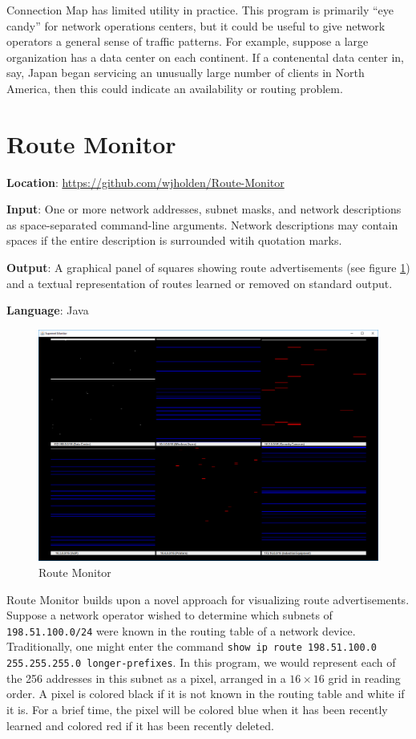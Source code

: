 \documentclass[12pt]{article}
\begin{document}
Connection Map has limited utility in practice. This program is primarily ``eye candy'' for network operations centers, but it could be useful to give network operators a general sense of traffic patterns. For example, suppose a large organization has a data center on each continent. If a contenental data center in, say, Japan began servicing an unusually large number of clients in North America, then this could indicate an availability or routing problem.

\section{Route Monitor}

\textbf{Location}: \url{https://github.com/wjholden/Route-Monitor}

\textbf{Input}: One or more network addresses, subnet masks, and network descriptions as space-separated command-line arguments. Network descriptions may contain spaces if the entire description is surrounded witih quotation marks.

\textbf{Output}: A graphical panel of squares showing route advertisements (see figure \ref{fig:Route-Monitor-1}) and a textual representation of routes learned or removed on standard output.

\textbf{Language}: Java

\begin{figure}[h]
\centering
\includegraphics[width=\textwidth]{Route-Monitor-1}
\caption{Route Monitor}
\label{fig:Route-Monitor-1}
\end{figure}

Route Monitor builds upon a novel approach for visualizing route advertisements. Suppose a network operator wished to determine which subnets of \texttt{198.51.100.0/24} were known in the routing table of a network device. Traditionally, one might enter the command \texttt{show ip route 198.51.100.0 255.255.255.0 longer-prefixes}. In this program, we would represent each of the 256 addresses in this subnet as a pixel, arranged in a $16 \times 16$ grid in reading order. A pixel is colored black if it is not known in the routing table and white if it is. For a brief time, the pixel will be colored blue when it has been recently learned and colored red if it has been recently deleted.
\end{document}

